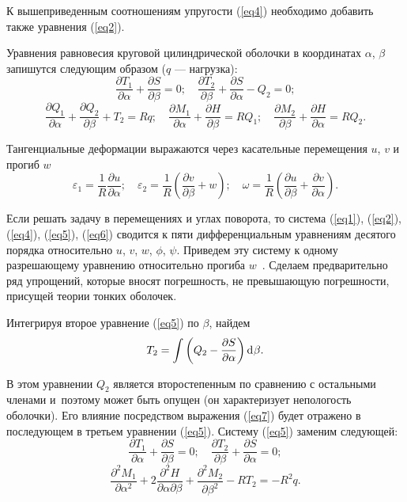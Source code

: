 \documentclass[press]{vestnik}
\begin{document}
К вышеприведенным соотношениям упругости (\ref{eq4}) необходимо добавить также 
уравнения (\ref{eq2}).

Уравнения равновесия круговой цилиндрической оболочки в координатах $\alpha$, $\beta $ запишутся следующим образом ($q$ --- нагрузка):
\begin{equation}
\label{eq5}
\frac{\partial T_{1} }{\partial \alpha }+\frac{\partial S}{\partial \beta 
}=0;
\quad
\frac{\partial T_{2} }{\partial \beta }+\frac{\partial S}{\partial \alpha 
}-Q_{2} =0;
\end{equation}
\[
\frac{\partial Q_{1} }{\partial \alpha }+\frac{\partial Q_{2} }{\partial 
\beta }+T_{2} =Rq;
\quad
\frac{\partial M_{1} }{\partial \alpha }+\frac{\partial H}{\partial \beta 
}=RQ_{1} ;
\quad
\frac{\partial M_{2} }{\partial \beta }+\frac{\partial H}{\partial \alpha 
}=RQ_{2} .
\]

Тангенциальные деформации выражаются через касательные перемещения $u$, $v$ и 
прогиб $w$
\begin{equation}
\label{eq6}
\varepsilon_{1} =\frac{1}{R}\frac{\partial u}{\partial \alpha };
\quad
\varepsilon_{2} =\frac{1}{R}\left( {\frac{\partial v}{\partial \beta }+w} 
\right);
\quad
\omega =\frac{1}{R}\left( {\frac{\partial u}{\partial \beta }+\frac{\partial 
v}{\partial \alpha }} \right).
\end{equation}

Если решать задачу в перемещениях и углах поворота, то система (\ref{eq1}), (\ref{eq2}), 
(\ref{eq4}), (\ref{eq5}), (\ref{eq6}) сводится к пяти дифференциальным уравнениям десятого 
порядка относительно $u$, $v$, $w$, $\phi$, $\psi $. Приведем эту систему к одному 
разрешающему уравнению относительно прогиба $w$~\cite{B12,B13}. Сделаем 
предварительно ряд упрощений, которые вносят погрешность, не превышающую 
погрешности, присущей теории тонких оболочек.

Интегрируя второе уравнение (\ref{eq5}) по $\beta $, найдем
\begin{equation}
\label{eq7}
T_{2} =\int {\left( {Q_{2} -\frac{\partial S}{\partial \alpha }} \right)\d\beta } .
\end{equation}

В этом уравнении $Q_{2} $ является второстепенным по сравнению с остальными 
членами и~поэтому может быть опущен (он характеризует непологость оболочки). 
Его влияние посредством выражения (\ref{eq7}) будет отражено в последующем в 
третьем уравнении (\ref{eq5}). Систему (\ref{eq5}) заменим следующей:
\begin{equation}
\label{eq8}
\frac{\partial T_{1} }{\partial \alpha }+\frac{\partial S}{\partial \beta 
}=0;
\quad
\frac{\partial T_{2} }{\partial \beta }+\frac{\partial S}{\partial \alpha 
}=0;
\end{equation}
\[
\frac{\partial^{2}M_{1} }{\partial \alpha^{2}}+2\frac{\partial 
^{2}H}{\partial \alpha \partial \beta }+\frac{\partial^{2}M_{2} }{\partial 
\beta^{2}}-RT_{2} =-R^{2}q.
\]
\end{document}
